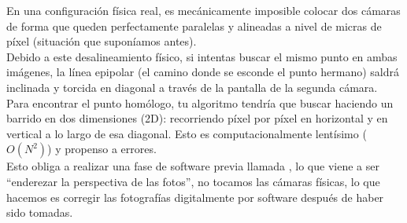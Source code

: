 \noindent
En una configuración física real, es mecánicamente imposible colocar dos cámaras de forma que queden perfectamente paralelas y alineadas a nivel de micras de píxel (situación que suponíamos antes). \\
\noindent
Debido a este desalineamiento físico, si intentas buscar el mismo punto en ambas imágenes, la línea epipolar (el camino donde se esconde el punto hermano) saldrá inclinada y torcida en diagonal a través de la pantalla de la segunda cámara. Para encontrar el punto homólogo, tu algoritmo tendría que buscar haciendo un barrido en dos dimensiones (2D): recorriendo píxel por píxel en horizontal y en vertical a lo largo de esa diagonal. Esto es computacionalmente lentísimo ($O(N^2)$) y propenso a errores.\\


\noindent
Esto obliga a realizar una fase de software previa llamada , lo que viene a ser ``enderezar la perspectiva de las fotos'', no tocamos las cámaras físicas, lo que hacemos es corregir las fotografías digitalmente por software después de haber sido tomadas.

